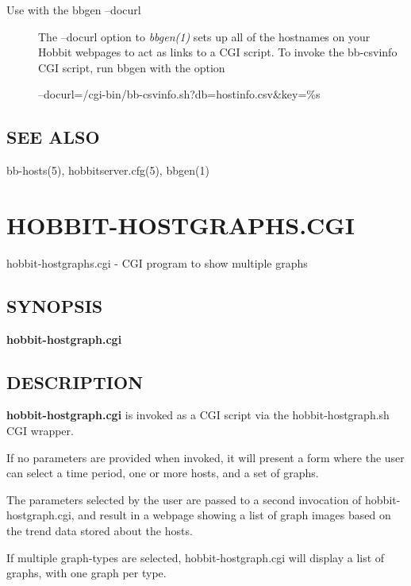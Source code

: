  \begin{description}
\item[Use with the bbgen --docurl] The --docurl option to \emph{bbgen(1)}
 sets up all of the hostnames on your Hobbit webpages to act as links
 to a CGI script. To invoke the bb-csvinfo CGI script, run bbgen with
 the option 


  
--docurl=/cgi-bin/bb-csvinfo.sh?db=hostinfo.csv\&key=\%s 



\end{description}

\subsection{SEE ALSO}
bb-hosts(5), hobbitserver.cfg(5), bbgen(1) 

 
%
\newpage
\section{HOBBIT-HOSTGRAPHS.CGI}
 hobbit-hostgraphs.cgi - CGI program to show multiple graphs 

\subsection{SYNOPSIS}
\textbf{hobbit-hostgraph.cgi}


\subsection{DESCRIPTION}
\textbf{hobbit-hostgraph.cgi} is invoked as a CGI script via the hobbit-hostgraph.sh CGI wrapper. 

  If no parameters are provided when invoked, it will present a form
  where the user can select a time period, one or more hosts, and a
  set of graphs. 



  The parameters selected by the user are passed to a second
  invocation of hobbit-hostgraph.cgi, and result in a webpage showing
  a list of graph images based on the trend data stored about the
  hosts. 



  If multiple graph-types are selected, hobbit-hostgraph.cgi will display a list of graphs, with one graph per type. 



